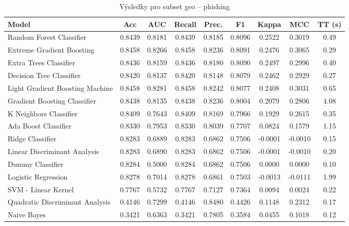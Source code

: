 \begin{table}[H]
  \centering
  \small
  \caption{Výsledky pro subset geo – phishing}
  \begin{tabular}{|l|c|c|c|c|c|c|c|c|}
    \hline
    \textbf{Model} & \textbf{Acc} & \textbf{AUC} & \textbf{Recall} & \textbf{Prec.} & \textbf{F1} & \textbf{Kappa} & \textbf{MCC} & \textbf{TT (s)} \\
    \hline
    Random Forest Classifier & 0.8439 & 0.8181 & 0.8439 & 0.8185 & 0.8096 & 0.2522 & 0.3019 & 0.49 \\
    Extreme Gradient Boosting & 0.8458 & 0.8266 & 0.8458 & 0.8236 & 0.8091 & 0.2476 & 0.3065 & 0.29 \\
    Extra Trees Classifier & 0.8436 & 0.8159 & 0.8436 & 0.8180 & 0.8090 & 0.2497 & 0.2996 & 0.40 \\
    Decision Tree Classifier & 0.8420 & 0.8137 & 0.8420 & 0.8148 & 0.8079 & 0.2462 & 0.2929 & 0.27 \\
    Light Gradient Boosting Machine & 0.8458 & 0.8281 & 0.8458 & 0.8242 & 0.8077 & 0.2408 & 0.3031 & 0.65 \\
    Gradient Boosting Classifier & 0.8438 & 0.8135 & 0.8438 & 0.8236 & 0.8004 & 0.2079 & 0.2806 & 4.08 \\
    K Neighbors Classifier & 0.8409 & 0.7643 & 0.8409 & 0.8169 & 0.7966 & 0.1929 & 0.2615 & 0.35 \\
    Ada Boost Classifier & 0.8330 & 0.7953 & 0.8330 & 0.8039 & 0.7707 & 0.0824 & 0.1579 & 1.15 \\
    Ridge Classifier & 0.8283 & 0.6889 & 0.8283 & 0.6862 & 0.7506 & -0.0001 & -0.0010 & 0.15 \\
    Linear Discriminant Analysis & 0.8283 & 0.6890 & 0.8283 & 0.6862 & 0.7506 & -0.0001 & -0.0010 & 0.20 \\
    Dummy Classifier & 0.8284 & 0.5000 & 0.8284 & 0.6862 & 0.7506 & 0.0000 & 0.0000 & 0.10 \\
    Logistic Regression & 0.8278 & 0.7014 & 0.8278 & 0.6861 & 0.7503 & -0.0013 & -0.0111 & 1.99 \\
    SVM - Linear Kernel & 0.7767 & 0.5732 & 0.7767 & 0.7127 & 0.7364 & 0.0094 & 0.0024 & 0.22 \\
    Quadratic Discriminant Analysis & 0.4146 & 0.7299 & 0.4146 & 0.8480 & 0.4426 & 0.1148 & 0.2312 & 0.17 \\
    Naive Bayes & 0.3421 & 0.6363 & 0.3421 & 0.7805 & 0.3584 & 0.0455 & 0.1018 & 0.12 \\
    \hline
  \end{tabular}
\end{table}
\vspace{0.5cm}

